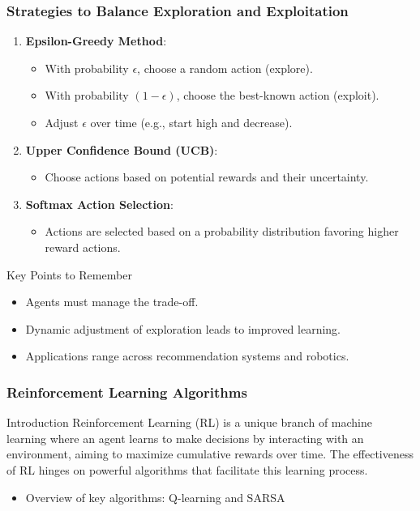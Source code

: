 \documentclass[aspectratio=169]{beamer}
\begin{document}
\begin{frame}[fragile]
    \frametitle{Strategies to Balance Exploration and Exploitation}
    
    \begin{enumerate}
        \item \textbf{Epsilon-Greedy Method}:
        \begin{itemize}
            \item With probability $\epsilon$, choose a random action (explore).
            \item With probability $(1 - \epsilon)$, choose the best-known action (exploit).
            \item Adjust $\epsilon$ over time (e.g., start high and decrease).
        \end{itemize}
        
        \item \textbf{Upper Confidence Bound (UCB)}:
        \begin{itemize}
            \item Choose actions based on potential rewards and their uncertainty.
        \end{itemize}
        
        \item \textbf{Softmax Action Selection}:
        \begin{itemize}
            \item Actions are selected based on a probability distribution favoring higher reward actions.
        \end{itemize}
    \end{enumerate}
    
    \begin{block}{Key Points to Remember}
        \begin{itemize}
            \item Agents must manage the trade-off.
            \item Dynamic adjustment of exploration leads to improved learning.
            \item Applications range across recommendation systems and robotics.
        \end{itemize}
    \end{block}
\end{frame}

\begin{frame}[fragile]
    \frametitle{Reinforcement Learning Algorithms}
    
    \begin{block}{Introduction}
        Reinforcement Learning (RL) is a unique branch of machine learning where an agent learns to make decisions by interacting with an environment, aiming to maximize cumulative rewards over time. The effectiveness of RL hinges on powerful algorithms that facilitate this learning process.
    \end{block}
    
    \begin{itemize}
        \item Overview of key algorithms: Q-learning and SARSA
    \end{itemize}
\end{frame}
\end{document}
